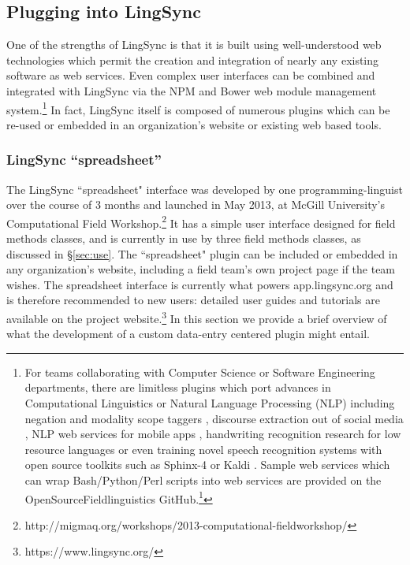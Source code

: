 \documentclass[letterpaper, 12pt, dvips]{mitwpl}
\begin{document}
\subsection{Plugging into LingSync}
\label{sec:plugins}


One of the strengths of LingSync is that it is built using well-understood web technologies which permit the creation and integration of nearly any existing software as web services. 
Even complex user interfaces can be combined and integrated with LingSync via the NPM and Bower web module management system.\footnote{
For teams collaborating with Computer Science or Software Engineering departments, there are limitless plugins which port advances in Computational Linguistics  \citep{Chen:2011}  or Natural Language Processing (NLP) including  negation and modality scope taggers  \citep{Rosenberg:2012}, %
discourse extraction out of social media  \citep{Dubuc:2010},  
NLP web services for mobile apps \citep{Sateli:2013},
 handwriting recognition research for low resource languages \citep{Sadri:2007} or even training novel speech recognition systems with
 open source toolkits such as Sphinx-4 \citep{Walker:2004} or Kaldi \citep{Povey:2011}.
Sample web services which can wrap Bash/Python/Perl scripts  into web services are provided on the OpenSourceFieldlinguistics GitHub.\footnote{https://github.com/OpenSourceFieldlinguistics} %
}
In fact, LingSync itself is composed of numerous plugins which can be re-used or embedded in an organization's website or existing web based tools.

\subsubsection{LingSync ``spreadsheet''}
\label{sec:spreadsheet}

The LingSync ``spreadsheet" interface was developed by one programming-linguist over the course of 3 months and launched in May 2013, at McGill University's Computational Field Workshop.\footnote{http://migmaq.org/workshops/2013-computational-fieldworkshop/} It has a simple user interface designed  for field methods classes, and is currently in use by three field methods classes, as discussed in \S \ref{sec:use}. The ``spreadsheet"  plugin can be included or embedded in any organization's website, including a field team's own project page if the team wishes. The spreadsheet interface is currently what powers app.lingsync.org and is therefore recommended to new users: detailed user guides and tutorials are available on the project website.\footnote{https://www.lingsync.org/} In this section we provide a brief overview of what the development of a custom data-entry centered plugin might entail. %
\end{document}

